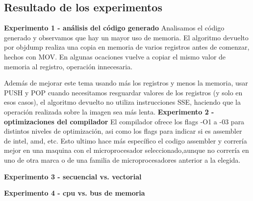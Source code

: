 \subsection{Resultado de los experimentos}

\vspace*{0.3cm} \noindent
\textbf{Experimento 1 - análisis del código generado}
%
Analisamos el c\'odigo generado y observamos que hay un mayor uso de memoria. El algoritmo devuelto por objdump realiza una copia en memoria de varios registros antes de 
comenzar, hechos con MOV. En algunas ocaciones vuelve a copiar el mismo valor de memoria al registro, operaci\'on innecesaria.

Adem\'as de mejorar este tema usando m\'as los registros y menos la memoria, usar PUSH y POP cuando necesitamos resguardar valores de los registros (y solo en esos casos), 
el algoritmo devuelto no utiliza instrucciones SSE, haciendo que la operaci\'on realizada sobre la imagen sea m\'as lenta.
\vspace*{0.3cm} \noindent
\textbf{Experimento 2 - optimizaciones del compilador}
El compilador ofrece los flags -O1 a -03 para distintos niveles de optimizaci\'on, asi como los flags para indicar si es assembler de intel, amd, etc. 
Esto ultimo hace m\'as espec\'ifico el codigo assembler y correr\'ia mejor en una maquina con el microprocesador seleccionado,aunque no correr\'ia en uno de otra marca o de una familia de microprocesadores anterior a la elegida.

\vspace*{0.3cm} \noindent
\textbf{Experimento 3 - secuencial vs. vectorial}

\vspace*{0.3cm} \noindent
\textbf{Experimento 4 - cpu vs. bus de memoria}

